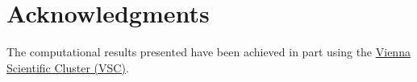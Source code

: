 \documentclass[11pt,a4paper]{article}
\begin{document}
\section*{Acknowledgments}
The computational results presented have been achieved in part using the \href{http://vsc.ac.at}{Vienna Scientific Cluster (VSC)}.

%
%


\end{document}
